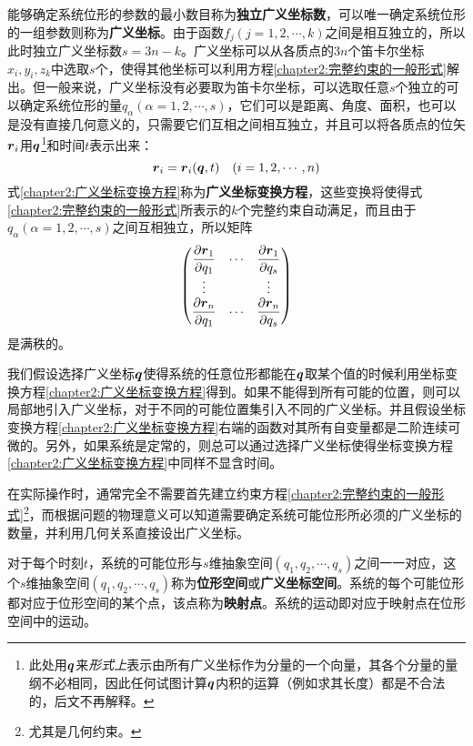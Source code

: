 能够确定系统位形的参数的最小数目称为{\bf 独立广义坐标数}，可以唯一确定系统位形的一组参数则称为{\bf 广义坐标}。由于函数$f_j(j=1,2,\cdots,k)$之间是相互独立的，所以此时独立广义坐标数$s=3n-k$。广义坐标可以从各质点的$3n$个笛卡尔坐标$x_i,y_i,z_k$中选取$s$个，使得其他坐标可以利用方程\eqref{chapter2:完整约束的一般形式}解出。但一般来说，广义坐标没有必要取为笛卡尔坐标，可以选取任意$s$个独立的可以确定系统位形的量$q_\alpha(\alpha=1,2,\cdots,s)$，它们可以是距离、角度、面积，也可以是没有直接几何意义的，只需要它们互相之间相互独立，并且可以将各质点的位矢$\boldsymbol{r}_i$用$\boldsymbol{q}$\footnote{此处用$\boldsymbol{q}$来{\it 形式上}表示由所有广义坐标作为分量的一个向量，其各个分量的量纲不必相同，因此任何试图计算$\boldsymbol{q}$内积的运算（例如求其长度）都是不合法的，后文不再解释。}和时间$t$表示出来：
\begin{equation}
	\boldsymbol{r}_i = \boldsymbol{r}_i(\boldsymbol{q},t)\quad (i=1,2,\cdots,n)
	\label{chapter2:广义坐标变换方程}
\end{equation}
式\eqref{chapter2:广义坐标变换方程}称为{\bf 广义坐标变换方程}，这些变换将使得式\eqref{chapter2:完整约束的一般形式}所表示的$k$个完整约束自动满足，而且由于$q_\alpha(\alpha=1,2,\cdots,s)$之间互相独立，所以矩阵
\begin{equation}
	\begin{pmatrix}
		\dfrac{\partial \boldsymbol{r}_1}{\partial q_1} & \cdots & \dfrac{\partial \boldsymbol{r}_1}{\partial q_s} \\
		\vdots & & \vdots \\
		\dfrac{\partial \boldsymbol{r}_n}{\partial q_1} & \cdots & \dfrac{\partial \boldsymbol{r}_n}{\partial q_s}
	\end{pmatrix}
	\label{chapter2:坐标变换方程的Jacobi矩阵}
\end{equation}
是满秩的。

我们假设选择广义坐标$\boldsymbol{q}$使得系统的任意位形都能在$\boldsymbol{q}$取某个值的时候利用坐标变换方程\eqref{chapter2:广义坐标变换方程}得到。如果不能得到所有可能的位置，则可以局部地引入广义坐标，对于不同的可能位置集引入不同的广义坐标。并且假设坐标变换方程\eqref{chapter2:广义坐标变换方程}右端的函数对其所有自变量都是二阶连续可微的。另外，如果系统是定常的，则总可以通过选择广义坐标使得坐标变换方程\eqref{chapter2:广义坐标变换方程}中同样不显含时间。

在实际操作时，通常完全不需要首先建立约束方程\eqref{chapter2:完整约束的一般形式}\footnote{尤其是几何约束。}，而根据问题的物理意义可以知道需要确定系统可能位形所必须的广义坐标的数量，并利用几何关系直接设出广义坐标。

对于每个时刻$t$，系统的可能位形与$s$维抽象空间$(q_1,q_2,\cdots,q_s)$之间一一对应，这个$s$维抽象空间$(q_1,q_2,\cdots,q_s)$称为{\bf 位形空间}或{\bf 广义坐标空间}。系统的每个可能位形都对应于位形空间的某个点，该点称为{\bf 映射点}。系统的运动即对应于映射点在位形空间中的运动。

